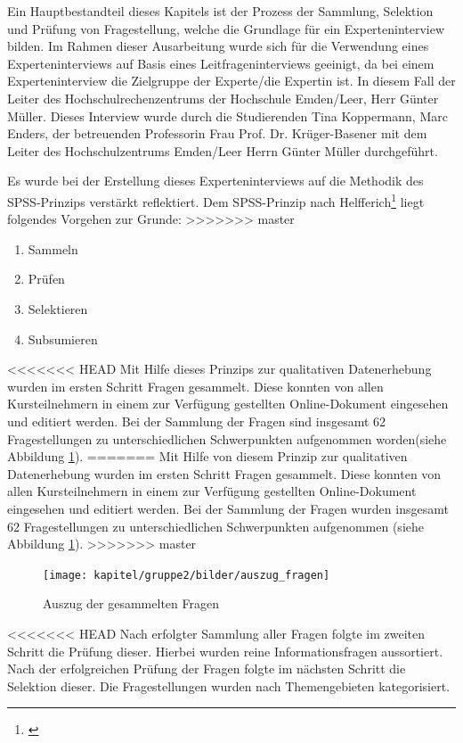 Ein Hauptbestandteil dieses Kapitels ist der Prozess der Sammlung, Selektion und Prüfung von Fragestellung, welche die Grundlage für ein Experteninterview bilden. Im Rahmen dieser Ausarbeitung wurde sich für die Verwendung eines Experteninterviews auf Basis eines Leitfrageninterviews geeinigt, da bei einem Experteninterview die Zielgruppe der Experte/die Expertin ist. In diesem Fall der Leiter des Hochschulrechenzentrums der Hochschule Emden/Leer, Herr Günter Müller. Dieses Interview wurde durch die Studierenden Tina Koppermann, Marc Enders, der betreuenden Professorin Frau Prof. Dr. Krüger-Basener mit dem Leiter des Hochschulzentrums Emden/Leer Herrn Günter Müller durchgeführt. 

Es wurde bei der Erstellung dieses Experteninterviews auf die Methodik des SPSS-Prinzips verstärkt reflektiert. Dem SPSS-Prinzip nach Helfferich\footnote{\cite{helfferich_2009}} liegt folgendes Vorgehen zur Grunde:
>>>>>>> master
\begin{enumerate}
	\item Sammeln
	\item Prüfen
	\item Selektieren
	\item Subsumieren		
\end{enumerate}
<<<<<<< HEAD
Mit Hilfe dieses Prinzips zur qualitativen Datenerhebung wurden im ersten Schritt Fragen gesammelt. Diese konnten von allen Kursteilnehmern in einem zur Verfügung gestellten Online-Dokument eingesehen und editiert werden. Bei der Sammlung der Fragen sind insgesamt 62 Fragestellungen zu unterschiedlichen Schwerpunkten aufgenommen worden(siehe Abbildung \ref{fig_auszug_fragen_sammeln}).
=======
Mit Hilfe von diesem Prinzip zur qualitativen Datenerhebung wurden im ersten Schritt Fragen gesammelt. Diese konnten von allen Kursteilnehmern in einem zur Verfügung gestellten Online-Dokument eingesehen und editiert werden. Bei der Sammlung der Fragen wurden insgesamt 62 Fragestellungen zu unterschiedlichen Schwerpunkten aufgenommen (siehe Abbildung \ref{fig_auszug_fragen_sammeln}).
>>>>>>> master

\begin{figure}[h!]
	\centering
	\texttt{[image: kapitel/gruppe2/bilder/auszug\_fragen]}
	\caption{Auszug der gesammelten Fragen}
	\label{fig_auszug_fragen_sammeln}
\end{figure}
<<<<<<< HEAD
Nach erfolgter Sammlung aller Fragen folgte im zweiten Schritt die Prüfung dieser. Hierbei wurden reine Informationsfragen aussortiert. Nach der erfolgreichen Prüfung der Fragen folgte im nächsten Schritt die Selektion dieser. Die Fragestellungen wurden nach Themengebieten kategorisiert. 

